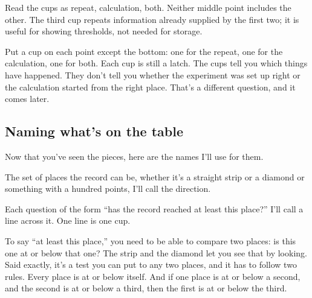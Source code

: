 \documentclass[11pt,twoside]{article}
\theoremstyle{thielethm}
\theoremstyle{thieledef}
\theoremstyle{thieledef}
\theoremstyle{thieledef}
\theoremstyle{thielethm}
\theoremstyle{thieleobs}
\theoremstyle{thielethm}
\begin{document}
\begin{center}

\small Read the cups as repeat, calculation, both. Neither middle point
includes the other. The third cup repeats information already supplied by
the first two; it is useful for showing thresholds, not needed for storage.
\end{center}

Put a cup on each point except the bottom: one for the repeat, one for the calculation, one for both. Each cup is still a latch. The cups tell you which things have happened. They don't tell you whether the experiment was set up right or the calculation started from the right place. That's a different question, and it comes later.

\subsection{Naming what's on the table}

Now that you've seen the pieces, here are the names I'll use for them.

The set of places the record can be, whether it's a straight strip or a diamond or something with a hundred points, I'll call the direction.

Each question of the form ``has the record reached at least this place?'' I'll call a line across it. One line is one cup.

To say ``at least this place,'' you need to be able to compare two places: is this one at or below that one? The strip and the diamond let you see that by looking. Said exactly, it's a test you can put to any two places, and it has to follow two rules. Every place is at or below itself. And if one place is at or below a second, and the second is at or below a third, then the first is at or below the third.
\end{document}
